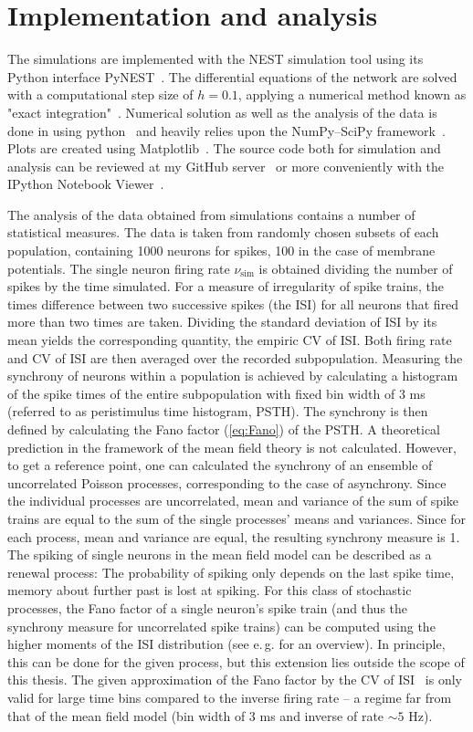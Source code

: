 \FloatBarrier
\section{Implementation and analysis}
\label{subsec:analysis}
The simulations are implemented with the NEST simulation tool using its Python interface
PyNEST~\cite{NEST}. The differential equations of the network are solved with a computational 
step size of $h=0.1$, applying a numerical method known as "exact integration"~\cite{rotter1999exact}.
Numerical solution as well as the analysis of the data is done in using 
python~\cite{python} and heavily relies upon the NumPy--SciPy framework~\cite{scipy}. 
Plots are created using Matplotlib~\cite{matplotlib}.
The source code both for simulation and analysis can be reviewed at my
GitHub server~\cite{ba_github} or more conveniently with the 
IPython Notebook Viewer~\cite{notebook_viewer}.

The analysis of the data obtained from simulations contains a number of 
statistical measures. The data is taken from randomly chosen subsets of each population, 
containing 1000 neurons for spikes, 100 in the case of membrane potentials. 
The single neuron firing rate $\nu_\text{sim}$ is 
obtained dividing the number of spikes by the time simulated. 
For a measure of irregularity of spike trains, the times difference
between two successive spikes (the ISI) for all neurons that fired more than two times 
are taken. Dividing the standard deviation of ISI by its mean
yields the corresponding quantity, the empiric CV of ISI. Both firing rate and CV of ISI 
are then averaged over the recorded subpopulation. 
Measuring the synchrony of neurons within a population is achieved by 
calculating a histogram of the spike times of the entire subpopulation
with fixed bin width of $3$ ms (referred to as peristimulus time histogram, PSTH).
The synchrony is then defined by calculating the Fano factor
(\autoref{eq:Fano}) of the PSTH.
A theoretical prediction in the framework of the mean field theory is not calculated. 
However, to get a reference point, one can calculated the synchrony of an ensemble 
of uncorrelated Poisson processes, corresponding to the case of asynchrony. 
Since the individual processes are uncorrelated, mean and variance of the sum of 
spike trains are equal to the sum of the single processes' means and variances. 
Since for each process, mean and variance are equal, the resulting synchrony measure is 1. 
The spiking of single neurons in the mean field model can be described as a renewal 
process: The probability of spiking only depends on the last spike time, memory about 
further past is lost at spiking. For this class of stochastic processes, the Fano factor 
of a single neuron's spike train (and thus the synchrony measure for uncorrelated spike trains)
can be computed using the higher moments of the
ISI distribution (see e.\,g.  for an overview). In principle,
this can be done for the given process, but this extension lies outside the scope of this
thesis. The given approximation of the Fano factor by the CV of ISI~\cite{van2010stochastic}
is only valid for large time bins compared to the inverse firing rate -- a regime far from 
that of the mean field model (bin width of 3 ms and inverse of rate $\sim 5$ Hz).

